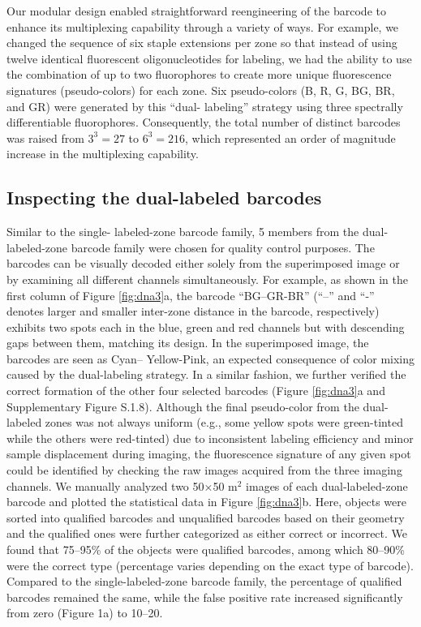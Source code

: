 Our modular design enabled straightforward reengineering of the barcode to 
enhance its multiplexing capability through a variety of ways. For example, we changed 
the sequence of six staple extensions per zone so that instead of using twelve identical 
fluorescent oligonucleotides for labeling, we had the ability to use the combination of up 
to two fluorophores to create more unique fluorescence signatures (pseudo-colors) for 
each zone. Six pseudo-colors (B, R, G, BG, BR, and GR) were generated by this “dual- 
labeling” strategy using three spectrally differentiable fluorophores. Consequently, the 
total number of distinct barcodes was raised from $3^3=27$ to $6^3=216$, which represented 
an order of magnitude increase in the multiplexing capability. 

\subsection{Inspecting the dual-labeled barcodes}
Similar to the single- 
labeled-zone barcode family, 5 members from the dual-labeled-zone barcode family were 
chosen for quality control purposes. The barcodes can be visually decoded either solely 
from the superimposed image or by examining all different channels simultaneously. For 
example, as shown in the first column of Figure \ref{fig:dna3}a, the barcode “BG--GR-BR” (“--” and 
“-” denotes larger and smaller inter-zone distance in the barcode, respectively) exhibits
two spots each in the blue, green and red channels but with descending gaps between 
them, matching its design. In the superimposed image, the barcodes are seen as Cyan-- 
Yellow-Pink, an expected consequence of color mixing caused by the dual-labeling 
strategy. In a similar fashion, we further verified the correct formation of the other four 
selected barcodes (Figure \ref{fig:dna3}a and Supplementary Figure S.1.8). Although the final pseudo-color from the dual- 
labeled zones was not always uniform (e.g., some yellow spots were green-tinted while 
the others were red-tinted) due to inconsistent labeling efficiency and minor sample 
displacement during imaging, the fluorescence signature of any given spot could be 
identified by checking the raw images acquired from the three imaging channels. We 
manually analyzed two 50×50 \textmu m$^2$ images of each dual-labeled-zone barcode and 
plotted the statistical data in Figure \ref{fig:dna3}b. Here, objects were sorted into qualified barcodes 
and unqualified barcodes based on their geometry and the qualified ones were further 
categorized as either correct or incorrect. We found that 75–95\% of the objects were 
qualified barcodes, among which 80–90\% were the correct type (percentage varies 
depending on the exact type of barcode). Compared to the single-labeled-zone barcode 
family, the percentage of qualified barcodes remained the same, while the false positive 
rate increased significantly from zero (Figure 1a) to 10–20.


